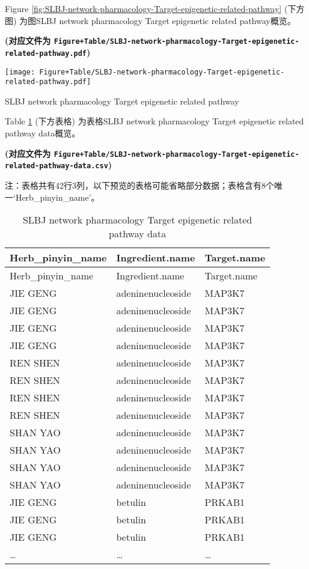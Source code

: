 \documentclass[
]{article}
\begin{document}
Figure \ref{fig:SLBJ-network-pharmacology-Target-epigenetic-related-pathway} (下方图) 为图SLBJ network pharmacology Target epigenetic related pathway概览。

\textbf{(对应文件为 \texttt{Figure+Table/SLBJ-network-pharmacology-Target-epigenetic-related-pathway.pdf})}

\def\@captype{figure}
\begin{center}
\texttt{[image: Figure+Table/SLBJ-network-pharmacology-Target-epigenetic-related-pathway.pdf]}
\caption{SLBJ network pharmacology Target epigenetic related pathway}\label{fig:SLBJ-network-pharmacology-Target-epigenetic-related-pathway}
\end{center}

Table \ref{tab:SLBJ-network-pharmacology-Target-epigenetic-related-pathway-data} (下方表格) 为表格SLBJ network pharmacology Target epigenetic related pathway data概览。

\textbf{(对应文件为 \texttt{Figure+Table/SLBJ-network-pharmacology-Target-epigenetic-related-pathway-data.csv})}

\begin{center}\begin{tcolorbox}[colback=gray!10, colframe=gray!50, width=0.9\linewidth, arc=1mm, boxrule=0.5pt]注：表格共有42行3列，以下预览的表格可能省略部分数据；表格含有8个唯一`Herb\_pinyin\_name'。
\end{tcolorbox}
\end{center}

\begin{longtable}[]{@{}lll@{}}
\caption{\label{tab:SLBJ-network-pharmacology-Target-epigenetic-related-pathway-data}SLBJ network pharmacology Target epigenetic related pathway data}\tabularnewline
\toprule
Herb\_pinyin\_name & Ingredient.name & Target.name\tabularnewline
\midrule
\endfirsthead
\toprule
Herb\_pinyin\_name & Ingredient.name & Target.name\tabularnewline
\midrule
\endhead
JIE GENG & adeninenucleoside & MAP3K7\tabularnewline
JIE GENG & adeninenucleoside & MAP3K7\tabularnewline
JIE GENG & adeninenucleoside & MAP3K7\tabularnewline
JIE GENG & adeninenucleoside & MAP3K7\tabularnewline
REN SHEN & adeninenucleoside & MAP3K7\tabularnewline
REN SHEN & adeninenucleoside & MAP3K7\tabularnewline
REN SHEN & adeninenucleoside & MAP3K7\tabularnewline
REN SHEN & adeninenucleoside & MAP3K7\tabularnewline
SHAN YAO & adeninenucleoside & MAP3K7\tabularnewline
SHAN YAO & adeninenucleoside & MAP3K7\tabularnewline
SHAN YAO & adeninenucleoside & MAP3K7\tabularnewline
SHAN YAO & adeninenucleoside & MAP3K7\tabularnewline
JIE GENG & betulin & PRKAB1\tabularnewline
JIE GENG & betulin & PRKAB1\tabularnewline
JIE GENG & betulin & PRKAB1\tabularnewline
\ldots{} & \ldots{} & \ldots{}\tabularnewline
\bottomrule
\end{longtable}
\end{document}

